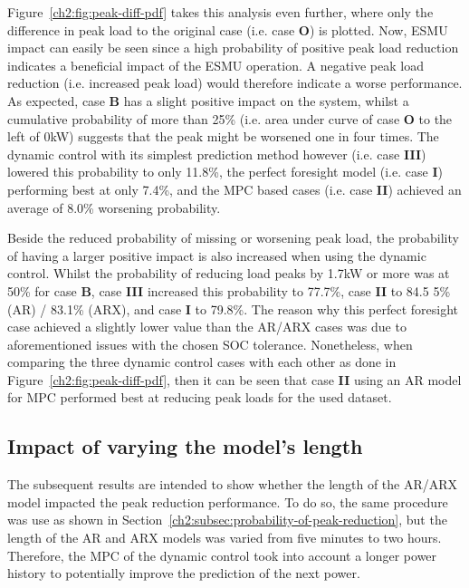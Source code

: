 

Figure~\ref{ch2:fig:peak-diff-pdf} takes this analysis even further, where only the difference in peak load to the original case (i.e. case \textbf{O}) is plotted.
Now, ESMU impact can easily be seen since a high probability of positive peak load reduction indicates a beneficial impact of the ESMU operation.
A negative peak load reduction (i.e. increased peak load) would therefore indicate a worse performance.
As expected, case \textbf{B} has a slight positive impact on the system, whilst a cumulative probability of more than 25\% (i.e. area under curve of case \textbf{O} to the left of 0kW) suggests that the peak might be worsened one in four times.
The dynamic control with its simplest prediction method however (i.e. case \textbf{III}) lowered this probability to only 11.8\%, the perfect foresight model (i.e. case \textbf{I}) performing best at only 7.4\%, and the MPC based cases (i.e. case \textbf{II}) achieved an average of 8.0\% worsening probability.

Beside the reduced probability of missing or worsening peak load, the probability of having a larger positive impact is also increased when using the dynamic control.
Whilst the probability of reducing load peaks by 1.7kW or more was at 50\% for case \textbf{B}, case \textbf{III} increased this probability to 77.7\%, case \textbf{II} to 84.5 5\% (AR) / 83.1\% (ARX), and case \textbf{I} to 79.8\%.
The reason why this perfect foresight case achieved a slightly lower value than the AR/ARX cases was due to aforementioned issues with the chosen SOC tolerance.
Nonetheless, when comparing the three dynamic control cases with each other as done in Figure~\ref{ch2:fig:peak-diff-pdf}, then it can be seen that case \textbf{II} using an AR model for MPC performed best at reducing peak loads for the used dataset.

\subsection{Impact of varying the model's length}

The subsequent results are intended to show whether the length of the AR/ARX model impacted the peak reduction performance.
To do so, the same procedure was use as shown in Section~\ref{ch2:subsec:probability-of-peak-reduction}, but the length of the AR and ARX models was varied from five minutes to two hours.
Therefore, the MPC of the dynamic control took into account a longer power history to potentially improve the prediction of the next power.

